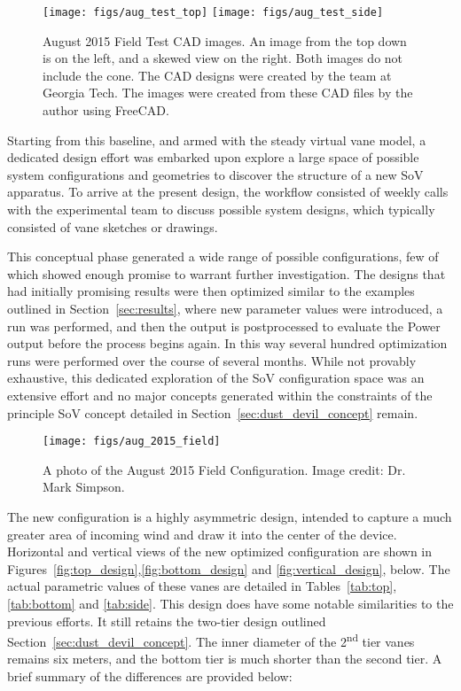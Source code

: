   \begin{figure}
   \centering
   \texttt{[image: figs/aug\_test\_top]}
   \hfill
   \texttt{[image: figs/aug\_test\_side]}
   \caption{August 2015 Field Test CAD images. An image from the top
   down is on the left, and a skewed view on the right. Both images do
   not include the cone. The CAD designs were created by the team at
   Georgia Tech. The images were created from these CAD files by the
   author using FreeCAD\cite{Falck}.}  
   \label{fig:cad_aug_2015}
  \end{figure}

Starting from this baseline, and armed with the steady virtual vane
model, a dedicated design effort was embarked upon explore a large space
of possible system configurations and geometries to discover the
structure of a new SoV apparatus. To arrive at the present design, the
workflow consisted of weekly calls with the experimental team to discuss
possible system designs, which typically consisted of vane sketches or
drawings.  

This conceptual phase generated a wide range of possible
configurations, few of which showed enough promise to warrant further
investigation. The designs that had initially promising results were
then optimized similar to the examples outlined in
Section~\ref{sec:results}, where new parameter values were introduced, a
run was performed, and then the output is postprocessed to evaluate the
Power output before the process begins again. In this way several
hundred optimization runs were performed over the course of several
months. While not provably exhaustive, this dedicated exploration of the 
SoV configuration space was an extensive effort and no major concepts
generated within the constraints of the principle SoV concept detailed
in Section~\ref{sec:dust_devil_concept} remain. 

  \begin{figure}
   \centering
   \texttt{[image: figs/aug\_2015\_field]}
   \caption{A photo of the August 2015 Field Configuration. Image
   credit: Dr. Mark Simpson.}  
   \label{fig:aug_2015_field}
  \end{figure}

The new configuration is a highly asymmetric design, intended to capture
a much greater area of incoming wind and draw it into the center of the
device. Horizontal and vertical views of the new optimized configuration
are shown in Figures~\ref{fig:top_design},\ref{fig:bottom_design} and
\ref{fig:vertical_design}, below. The actual parametric values of these
vanes are detailed in Tables~\ref{tab:top},\ref{tab:bottom} and
\ref{tab:side}. This design does have some notable 
similarities to the previous efforts. It still retains the two-tier
design outlined Section~\ref{sec:dust_devil_concept}. The inner diameter 
of the 2\textsuperscript{nd} tier vanes remains six meters, and the
bottom tier is much shorter than the second tier. A brief summary of the
differences are provided below:      

